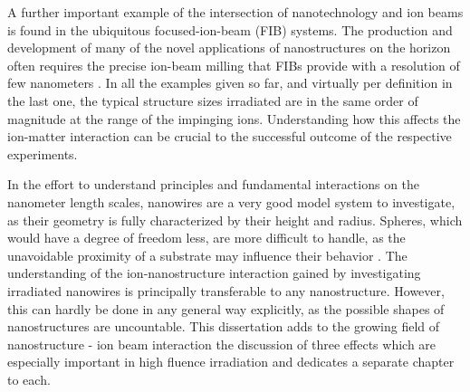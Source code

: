 A further important example of the intersection of nanotechnology and ion beams is found in the ubiquitous focused-ion-beam (FIB) systems. The production and development of many of the novel applications of nanostructures on the horizon often requires the precise ion-beam milling that FIBs provide with a resolution of few nanometers \cite{kranz_integrating_2001,george_nanopore_2010,chalapat_self-organized_2013}. In all the examples given so far, and virtually per definition in the last one, the typical structure sizes irradiated are in the same order of magnitude at the range of the impinging ions. Understanding how this affects the ion-matter interaction can be crucial to the successful outcome of the respective experiments.

In the effort to understand principles and fundamental interactions on the nanometer length scales, nanowires are a very good model system to investigate, as their geometry is fully characterized by their height and radius. Spheres, which would have a degree of freedom less, are more difficult to handle, as the unavoidable proximity of a substrate may influence their behavior \cite{hu_burrowing_2002,klimmer_size-dependent_2009,moller_tri3dyn_2014,johannes_ion_2015}. The understanding of the ion-nanostructure interaction gained by investigating irradiated nanowires is principally transferable to any nanostructure. However, this can hardly be done in any general way explicitly, as the possible shapes of nanostructures are uncountable. This dissertation adds to the growing field of nanostructure - ion beam interaction the discussion of three effects which are especially important in high fluence irradiation and dedicates a separate chapter to each. 
 
